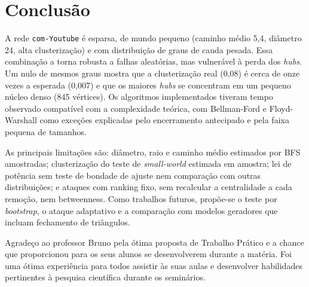 \documentclass[sigconf]{webmedia}
\begin{document}
\section{Conclusão}
\label{sec:conclusao}
A rede \texttt{com-Youtube} é esparsa, de mundo pequeno (caminho médio 5,4, diâmetro 24, alta clusterização) e com distribuição de graus de cauda pesada. Essa combinação a torna robusta a falhas aleatórias, mas vulnerável à perda dos \emph{hubs}. Um nulo de mesmos graus mostra que a clusterização real (0,08) é cerca de onze vezes a esperada (0,007) e que os maiores \emph{hubs} se concentram em um pequeno núcleo denso (845 vértices). Os algoritmos implementados tiveram tempo observado compatível com a complexidade teórica, com Bellman-Ford e Floyd-Warshall como exceções explicadas pelo encerramento antecipado e pela faixa pequena de tamanhos.

As principais limitações são: diâmetro, raio e caminho médio estimados por BFS amostradas; clusterização do teste de \emph{small-world} estimada em amostra; lei de potência sem teste de bondade de ajuste nem comparação com outras distribuições; e ataques com ranking fixo, sem recalcular a centralidade a cada remoção, nem betweenness. Como trabalhos futuros, propõe-se o teste por \emph{bootstrap}, o ataque adaptativo e a comparação com modelos geradores que incluam fechamento de triângulos.

\begin{acks}
Agradeço ao professor Bruno pela ótima proposta de Trabalho Prático e a chance que proporcionou para os seus alunos se desenvolverem durante a matéria. Foi uma ótima experiência para todos assistir às suas aulas e  desenvolver habilidades pertinentes à pesquisa científica durante os seminários.
\end{acks}



\end{document}
